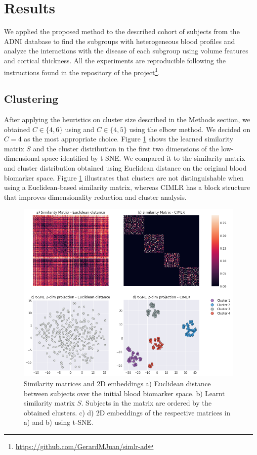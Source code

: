 \section{Results}

We applied the proposed method to the described cohort of subjects from the ADNI database to find the subgroups with heterogeneous blood profiles and analyze the interactions with the disease of each subgroup using volume features and cortical thickness. All the experiments are reproducible following the instructions found in the repository of the project\footnote{\url{https://github.com/GerardMJuan/simlr-ad}}.

\subsection{Clustering}

After applying the heuristics on cluster size described in the Methods section, we obtained $C\in\{4,6\}$ using  \cite{Zelnik-Manor} and $C\in\{4,5\}$ using the elbow method. We decided on $C=4$ as the most appropriate choice. Figure \ref{figclusters} shows the learned similarity matrix $S$ and the cluster distribution in the first two dimensions of the low-dimensional space identified by t-SNE. We compared it to the similarity matrix and cluster distribution obtained using Euclidean distance on the original blood biomarker space. Figure \ref{figclusters} illustrates that clusters are not distinguishable when using a Euclidean-based similarity matrix, whereas CIMLR has a block structure that improves dimensionality reduction and cluster analysis. \\

\begin{figure}[!htbp]
  \centering
\includegraphics[width=1.0\textwidth]{figures/cimlr/cluster_results_full.png}
\caption[Similarity matrices and 2D embeddings.]{Similarity matrices and 2D embeddings a) Euclidean distance between subjects over the initial blood biomarker space. b) Learnt similarity matrix $S$. Subjects in the matrix are ordered by the obtained clusters. c) d) 2D embeddings of the respective matrices in a) and b) using t-SNE.}
\label{figclusters}
\end{figure}

